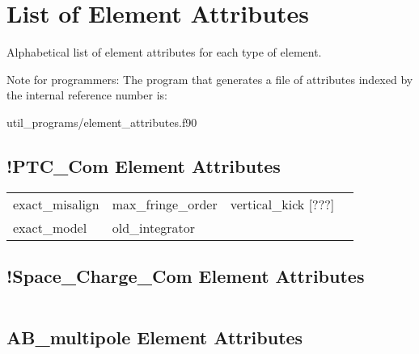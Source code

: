 \chapter{List of Element Attributes}
\label{c:attrib.list}

Alphabetical list of element attributes for each type of element. 

Note for programmers: The program that generates a file of attributes indexed by the
internal reference number is:
\begin{example}
  util_programs/element_attributes.f90 
\end{example}

 \section{!PTC_Com Element Attributes}
 \label{s:list.!ptc.com}
 
 \begin{tabular}{llll} \toprule
exact_misalign                   & max_fringe_order                 & vertical_kick [???]              &                                  \\
exact_model                      & old_integrator                   &                                  &                                  \\
 \bottomrule
 \end{tabular}
 \vfill
 
 \section{!Space_Charge_Com Element Attributes}
 \label{s:list.!space.charge.com}
 
 \begin{tabular}{llll} \toprule
 \bottomrule
 \end{tabular}
 \vfill
 
 \section{AB_multipole Element Attributes}
 \label{s:list.ab.multipole}
 
